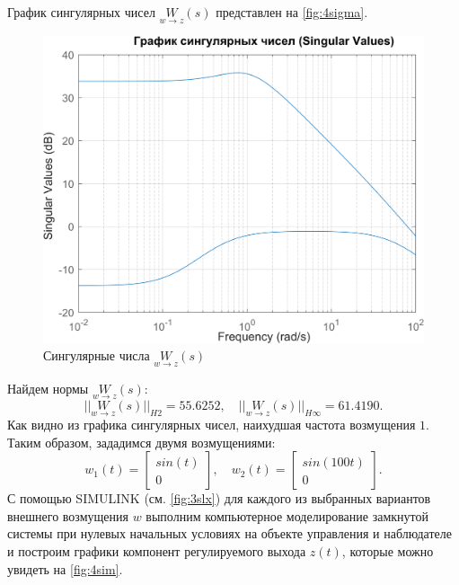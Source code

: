 График сингулярных чисел $\underset{w\rightarrow z}{W}(s)$ представлен на \autoref{fig:4sigma}.
\begin{figure}[H]
    \centering
    \includegraphics[width=0.7\linewidth]{figs/4_sigma.png}
    \caption{Сингулярные числа $\underset{w\rightarrow z}{W}(s)$}
    \label{fig:4sigma}
\end{figure}
\noindent Найдем нормы $\underset{w\rightarrow z}{W}(s)$:
\begin{equation*}
    ||\underset{w\rightarrow z}{W}(s)||_{H2}=55.6252,\quad
    ||\underset{w\rightarrow z}{W}(s)||_{H\infty}=61.4190.
\end{equation*}
Как видно из графика сингулярных чисел, наихудшая частота возмущения $1$.
Таким образом, зададимся двумя возмущениями:
\begin{equation*}
    w_1(t)=\begin{bmatrix}
        sin(t)\\
        0
    \end{bmatrix},\quad
    w_2(t)=\begin{bmatrix}
        sin(100t)\\
        0
    \end{bmatrix}.
\end{equation*}
С помощью SIMULINK (см. \autoref{fig:3slx}) для каждого из выбранных вариантов внешнего возмущения $w$ выполним 
компьютерное моделирование замкнутой системы при нулевых начальных условиях
на объекте управления и наблюдателе и построим графики компонент регулируемого выхода
$z(t)$, которые можно увидеть на \autoref{fig:4sim}.
